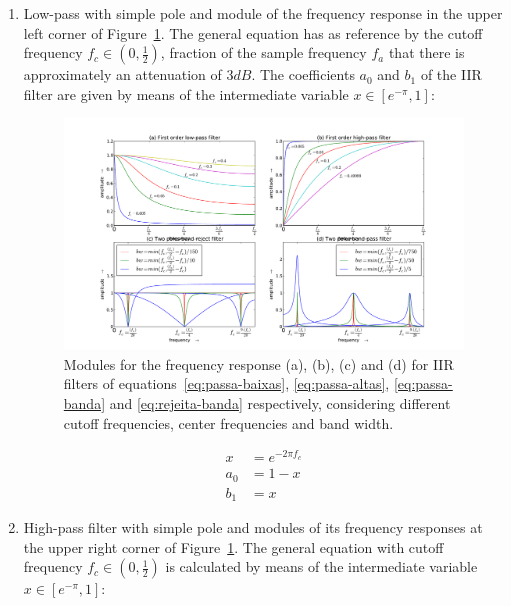 \documentclass[
 aip,
 jmp,
 amsmath,amssymb,
 reprint,
]{revtex4-1}
\begin{document}
\begin{enumerate}
  \item Low-pass with simple pole and module of the frequency response in the upper left corner of Figure~\ref{fig:iir}. The general equation has as reference by the cutoff frequency $f_c \in (0,\frac{1}{2})$, fraction of the sample frequency $f_a$ that there is approximately an attenuation of $3dB$.
  The coefficients $a_0$ and $b_1$ of the IIR filter are given by means of the intermediate variable $x \in [e^{-\pi},1]$:

\begin{figure}[h!]
    \centering
        \includegraphics[width=\columnwidth]{figures/iir}
    \caption{Modules for the frequency response (a), (b), (c) and (d) for IIR filters of equations~\ref{eq:passa-baixas}, \ref{eq:passa-altas}, \ref{eq:passa-banda} and \ref{eq:rejeita-banda} respectively, considering different cutoff frequencies, center frequencies and band width.}
        \label{fig:iir}
\end{figure}

\begin{equation}\label{eq:passa-baixas}
 \begin{split}
 x & =e^{-2\pi f_c} \\
 a_0 & =  1-x \\
 b_1 & =  x
 \end{split}
\end{equation}

  \item High-pass filter with simple pole and modules of its frequency responses at the upper right corner of Figure~\ref{fig:iir}. The general equation with cutoff frequency $f_c \in (0,\frac{1}{2})$ is calculated by means of the intermediate variable $x \in [e^{-\pi},1]$:


\end{enumerate}
\end{document}
